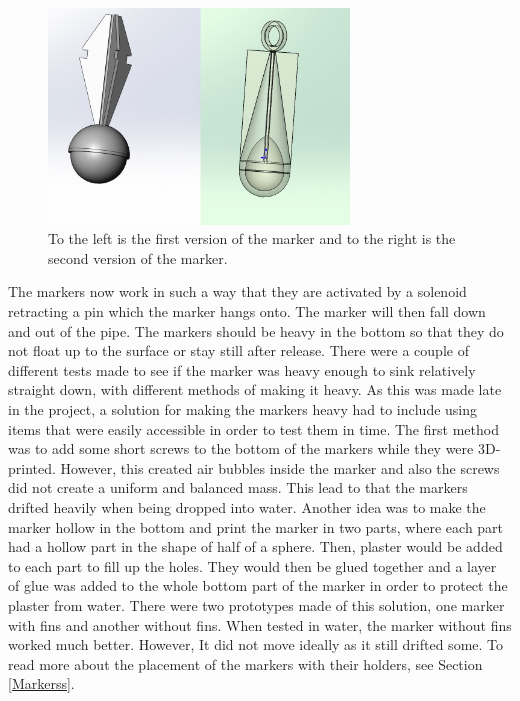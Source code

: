 \begin{figure}[!ht]
	\begin{center}
		\includegraphics[width=80mm]{./Images/Mechanics/FirstAndSecondMarker.jpg}
		\caption{To the left is the first version of the marker and to the right is the second version of the marker.}
		\label{MarkerPics}
	\end{center}
\end{figure}

The markers now work in such a way that they are activated by a solenoid retracting a pin which the marker hangs onto. The marker will then fall down and out of the pipe. The markers should be heavy in the bottom so that they do not float up to the surface or stay still after release. There were a couple of different tests made to see if the marker was heavy enough to sink relatively straight down, with different methods of making it heavy. As this was made late in the project, a solution for making the markers heavy had to include using items that were easily accessible in order to test them in time. The first method was to add some short screws to the bottom of the markers while they were 3D-printed. However, this created air bubbles inside the marker and also the screws did not create a uniform and balanced mass. This lead to that the markers drifted heavily when being dropped into water. Another idea was to make the marker hollow in the bottom and print the marker in two parts, where each part had a hollow part in the shape of half of a sphere. Then, plaster would be added to each part to fill up the holes. They would then be glued together and a layer of glue was added to the whole bottom part of the marker in order to protect the plaster from water. There were two prototypes made of this solution, one marker with fins and another without fins. When tested in water, the marker without fins worked much better. However, It did not move ideally as it still drifted some. To read more about the placement of the markers with their holders, see Section \ref{Markerss}. 


